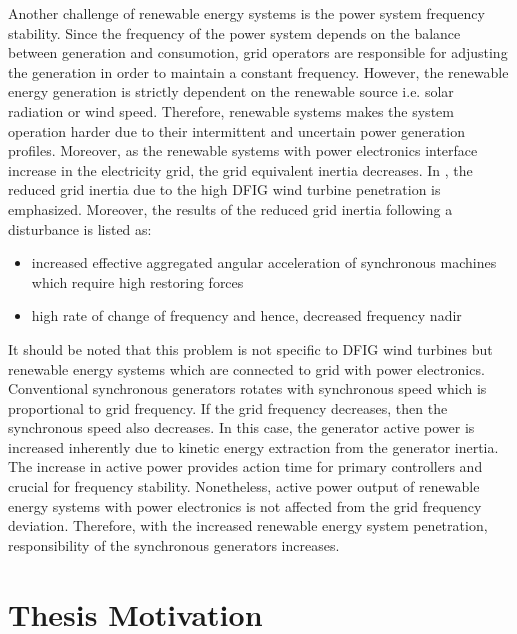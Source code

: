 Another challenge of renewable energy systems  is the power system frequency stability. Since the frequency of the power system depends on the balance between generation and consumotion, grid operators are responsible for adjusting the generation in order to maintain a constant frequency. However, the renewable energy generation is strictly dependent on the renewable source i.e. solar radiation or wind speed. Therefore, renewable systems makes the system operation harder due to their intermittent and uncertain power generation profiles. Moreover, as the renewable systems with power electronics interface increase in the electricity grid, the grid equivalent inertia decreases. In \cite{Gautam2011}, the reduced grid inertia due to the high DFIG wind turbine penetration is emphasized. Moreover, the results of the reduced grid inertia following a disturbance is listed as: 

\begin{itemize}
	\item increased effective aggregated angular acceleration of synchronous machines which require high restoring forces
	\item high rate of change of frequency and hence, decreased frequency nadir
\end{itemize}

It should be noted that this problem is not specific to DFIG wind turbines but renewable energy systems which are connected to grid with power electronics. Conventional synchronous generators rotates with synchronous speed which is proportional to grid frequency. If the grid frequency decreases, then the synchronous speed also decreases. In this case, the generator active power is increased inherently due to kinetic energy extraction from the generator inertia. The increase in active power provides action time for primary controllers and crucial for frequency stability. Nonetheless, active power output of renewable energy systems with power electronics is not affected from the grid frequency deviation. Therefore, with the increased renewable energy system penetration,  responsibility of the synchronous generators increases. 

\section{Thesis Motivation}




















